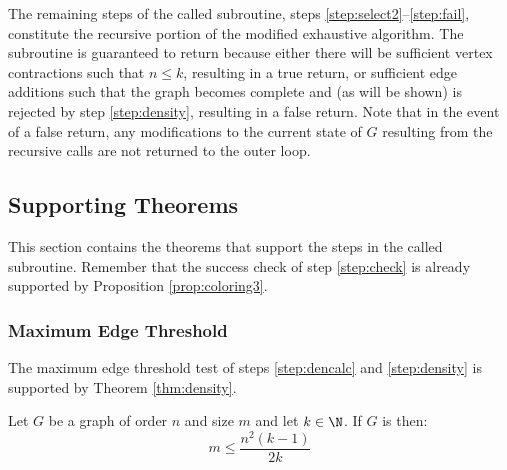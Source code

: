 The remaining steps of the called subroutine, steps \ref{step:select2}--\ref{step:fail}, constitute the recursive
portion of the modified exhaustive algorithm.  The subroutine is guaranteed to return because either there will be
sufficient vertex contractions such that \(n\le k\), resulting in a true return, or sufficient edge additions such
that the graph becomes complete and (as will be shown) is rejected by step \ref{step:density}, resulting in a false
return.  Note that in the event of a false return, any modifications to the current state of \(G\) resulting from
the recursive calls are not returned to the outer loop.

\clearpage

\subsection{Supporting Theorems}

This section contains the theorems that support the steps in the called subroutine.  Remember that the success check
of step \ref{step:check} is already supported by Proposition \ref{prop:coloring3}.

\subsubsection{Maximum Edge Threshold}

The maximum edge threshold test of steps \ref{step:dencalc} and \ref{step:density} is supported by Theorem
\ref{thm:density}.

\begin{theorem}
  \label{thm:density}
  Let \(G\) be a graph of order \(n\) and size \(m\) and let \(k\in\N\).  If \(G\) is  then:
  \[m\le\frac{n^2(k-1)}{2k}\]
\end{theorem}

